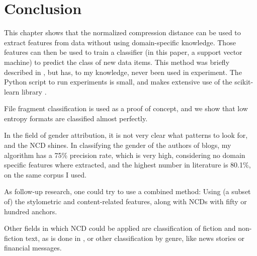 \section{Conclusion}

This chapter shows that the normalized compression distance can be used to extract features from data without using domain-specific knowledge. Those features can then be used to train a classifier (in this paper, a support vector machine) to predict the class of new data items. This method was briefly described in \cite{Cilibrasi2007}, but has, to my knowledge, never been used in experiment. The Python script to run experiments is small, and makes extensive use of the scikit-learn library \cite{Pedregosa2011}.

File fragment classification is used as a proof of concept, and we show that low entropy formats are classified almost perfectly.

In the field of gender attribution, it is not very clear what patterns to look for, and the NCD shines. In classifying the gender of the authors of blogs, my algorithm has a 75\% precision rate, which is very high, considering no domain specific features where extracted, and the highest number in literature is 80.1\%, on the same corpus I used.

As follow-up research, one could try to use a combined method: Using (a subset of) the stylometric and content-related features, along with NCDs with fifty or hundred anchors.

Other fields in which NCD could be applied are classification of fiction and non-fiction text, as is done in \cite{Koppel2002}, or other classification by genre, like news stories or financial messages.
